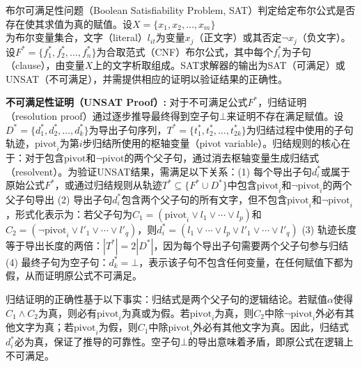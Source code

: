     布尔可满足性问题（Boolean Satisfiability Problem, SAT）判定给定布尔公式是否存在使其求值为真的赋值。设$X = \{x_1, x_2, \ldots, x_m\}$为布尔变量集合，文字（literal）$l_{it}$为变量$x_j$（正文字）或其否定$\neg x_j$（负文字）。设$F^* = \{f^*_1, f^*_2, \ldots, f^*_n\}$为合取范式（CNF）布尔公式，其中每个$f^*_i$为子句（clause），由变量$X$上的文字析取组成。SAT求解器的输出为SAT（可满足）或UNSAT（不可满足），并需提供相应的证明以验证结果的正确性。
    
    \textbf{不可满足性证明（UNSAT Proof）:}
    对于不可满足公式$F^*$，归结证明（resolution proof）通过逐步推导最终得到空子句$\bot$来证明不存在满足赋值。设$D^* = \{d^*_1, d^*_2, \ldots, d^*_k\}$为导出子句序列，$T^* = \{t^*_1, t^*_2, \ldots, t^*_{2k}\}$为归结过程中使用的子句轨迹，$\text{pivot}_i$为第$i$步归结所使用的枢轴变量（pivot variable）。归结规则的核心在于：对于包含$\text{pivot}$和$\neg\text{pivot}$的两个父子句，通过消去枢轴变量生成归结式（resolvent）。为验证UNSAT结果，需满足以下关系：(1) 每个导出子句$d^*_i$或属于原始公式$F^*$，或通过归结规则从轨迹$T^* \subseteq \{F^* \cup D^*\}$中包含$\text{pivot}_i$和$\neg\text{pivot}_i$的两个父子句导出 (2) 导出子句$d^*_i$包含两个父子句的所有文字，但不包含$\text{pivot}_i$和$\neg\text{pivot}_i$，形式化表示为：若父子句为$C_1 = (\text{pivot}_i \vee l_1 \vee \cdots \vee l_p)$和$C_2 = (\neg\text{pivot}_i \vee l'_1 \vee \cdots \vee l'_q)$，则$d^*_i = (l_1 \vee \cdots \vee l_p \vee l'_1 \vee \cdots \vee l'_q)$ (3) 轨迹长度等于导出长度的两倍：$|T^*| = 2|D^*|$，因为每个导出子句需要两个父子句参与归结 (4) 最终子句为空子句：$d^*_k = \bot$，表示该子句不包含任何变量，在任何赋值下都为假，从而证明原公式不可满足。
    
    归结证明的正确性基于以下事实：归结式是两个父子句的逻辑结论。\cite{10.1007/978-3-540-72788-0_31}若赋值$\alpha$使得$C_1 \wedge C_2$为真，则必有$\text{pivot}_i$为真或为假。若$\text{pivot}_i$为真，则$C_2$中除$\neg\text{pivot}_i$外必有其他文字为真；若$\text{pivot}_i$为假，则$C_1$中除$\text{pivot}_i$外必有其他文字为真。因此，归结式$d^*_i$必为真，保证了推导的可靠性。空子句$\bot$的导出意味着矛盾，即原公式在逻辑上不可满足。
    
